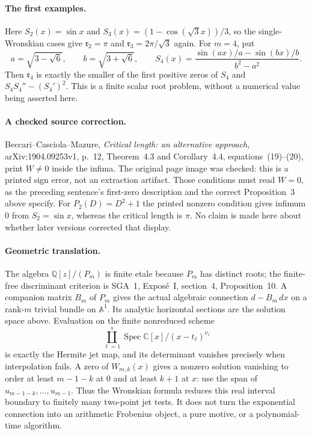 \paragraph{The first examples.}
Here $S_2(x)=\sin x$ and
$S_3(x)=(1-\cos(\sqrt3x))/3$, so the single-Wronskian cases give
$\mathfrak r_2=\pi$ and $\mathfrak r_3=2\pi/\sqrt3$ again.
For $m=4$, put
\[
 a=\sqrt{3-\sqrt6},\qquad b=\sqrt{3+\sqrt6},\qquad
 S_4(x)=\frac{\sin(ax)/a-\sin(bx)/b}{b^2-a^2}.
\]
Then $\mathfrak r_4$ is exactly the smaller of the first positive
zeros of $S_4$ and $S_4S_4''-(S_4')^2$. This is a finite scalar
root problem, without a numerical value being asserted here.

\paragraph{A checked source correction.}
Beccari--Casciola--Mazure, \emph{Critical length: an alternative
approach}, arXiv:1904.09253v1, p.~12, Theorem~4.3 and
Corollary~4.4, equations~(19)--(20), print $W\ne0$ inside the
infima. The original page image was checked: this is a printed
sign error, not an extraction artifact. Those conditions must
read $W=0$, as the preceding sentence's first-zero description
and the correct Proposition~3 above specify. For $P_2(D)=D^2+1$
the printed nonzero condition gives infimum $0$ from $S_2=\sin x$,
whereas the critical length is $\pi$. No claim is made here
about whether later versions corrected that display.

\paragraph{Geometric translation.}
The algebra $\mathbb Q[z]/(P_m)$ is finite etale because $P_m$
has distinct roots; the finite-free discriminant criterion is
SGA~1, Expos\'e~I, section~4, Proposition~10. A companion matrix
$B_m$ of $P_m$ gives the actual algebraic connection $d-B_m\,dx$ on a
rank-$m$ trivial bundle on $\mathbb A^1$. Its analytic horizontal
sections are the solution space above. Evaluation on the finite
nonreduced scheme
\[
              \coprod_{\ell=1}^s
                  \operatorname{Spec}\mathbb C[x]/(x-t_\ell)^{\nu_\ell}
\]
is exactly the Hermite jet map, and its determinant vanishes
precisely when interpolation fails. A zero of $W_{m,k}(x)$ gives
a nonzero solution vanishing to order at least $m-1-k$ at $0$
and at least $k+1$ at $x$: use the span of
$u_{m-1-k},\ldots,u_{m-1}$. Thus the Wronskian formula reduces
this real interval boundary to finitely many two-point jet tests.
It does not turn the exponential connection into an arithmetic
Frobenius object, a pure motive, or a polynomial-time algorithm.


